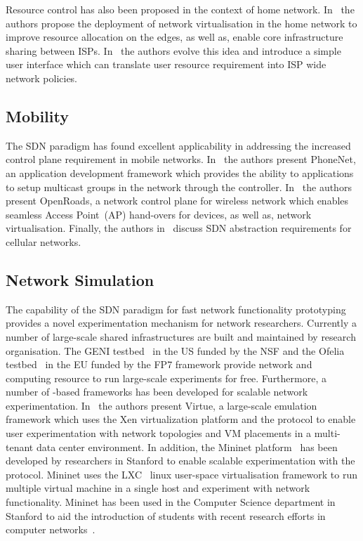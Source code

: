 Resource control has also been proposed in the context of home network.
In~\cite{Yiakoumis11} the authors propose the deployment of network
virtualisation in the home network to improve resource allocation on the edges,
as well as,  enable core infrastructure sharing between ISPs.
In~\cite{Yiakoumis12} the authors evolve this idea and introduce a simple user
interface which can translate user resource requirement into ISP wide network
policies. 

\subsection{Mobility}

The SDN paradigm has found excellent applicability in addressing the increased
control plane requirement in mobile networks. In~\cite{Huang10} the authors
present PhoneNet, an application development framework which provides the
ability to applications to setup multicast groups in the network through the
controller. In~\cite{Yap09,Yap10} the authors present OpenRoads, a network
control plane for wireless network which enables seamless Access Point~(AP)
hand-overs for devices, as well as, network virtualisation.  Finally, the
authors in~\cite{Li12} discuss SDN abstraction requirements for cellular
networks.

\subsection{Network Simulation}

The capability of the SDN paradigm for fast network functionality prototyping
provides a novel experimentation mechanism for network researchers.  Currently a
number of large-scale shared infrastructures are built and maintained by
research organisation. The GENI testbed~\cite{geni} in the US funded by the NSF
and the Ofelia testbed~\cite{ofelia} in the EU funded by the FP7 framework
provide network and computing resource to run large-scale experiments
for free. Furthermore, a number of \of-based frameworks has been developed
for scalable network experimentation.
In~\cite{Erickson11} the authors present Virtue, a large-scale emulation
framework which uses the Xen virtualization platform and the \of protocol to
enable user experimentation with network topologies and VM placements in a
multi-tenant data center environment.  In addition, the Mininet
platform~\cite{Lantz10,Handigol12} has been developed by researchers in Stanford
to enable scalable experimentation with the \of protocol. Mininet uses the
LXC~\cite{lxc} linux user-space virtualisation framework to run multiple virtual
machine in a single host and experiment with network functionality. Mininet has
been used in the Computer Science department in Stanford to aid the introduction
of students with recent research efforts in computer networks~\cite{cs244}. 

